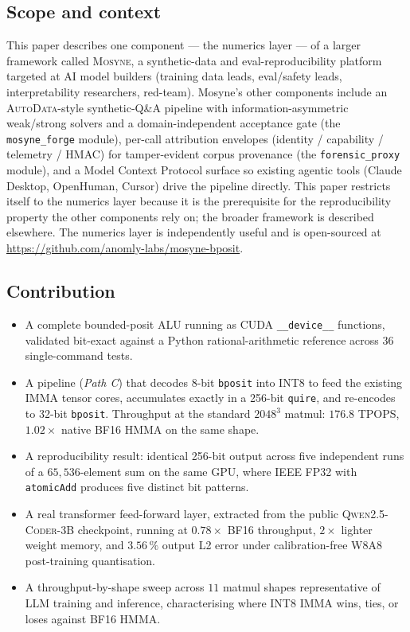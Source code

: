 \documentclass[11pt,a4paper]{article}
\newcommand{\bposit}{\texttt{bposit}}
\newcommand{\quire}{\texttt{quire}}
\newcommand{\TPOPS}{\textsf{TPOPS}}
\begin{document}
\subsection*{Scope and context}

This paper describes one component --- the numerics layer --- of a
larger framework called \textsc{Mosyne}, a synthetic-data and
eval-reproducibility platform targeted at AI model builders (training
data leads, eval/safety leads, interpretability researchers,
red-team). Mosyne's other components include an \textsc{AutoData}-style
synthetic-Q\&A pipeline with information-asymmetric weak/strong
solvers and a domain-independent acceptance gate (the
\texttt{mosyne\_forge} module), per-call attribution envelopes
(identity / capability / telemetry / HMAC) for tamper-evident corpus
provenance (the \texttt{forensic\_proxy} module), and a Model Context
Protocol surface so existing agentic tools (Claude Desktop, OpenHuman,
Cursor) drive the pipeline directly. This paper restricts itself to
the numerics layer because it is the prerequisite for the
reproducibility property the other components rely on; the broader
framework is described elsewhere. The numerics layer is independently
useful and is open-sourced at
\url{https://github.com/anomly-labs/mosyne-bposit}.

\subsection{Contribution}

\begin{itemize}
    \item A complete bounded-posit ALU running as CUDA
          \texttt{\_\_device\_\_} functions, validated bit-exact against
          a Python rational-arithmetic reference across 36
          single-command tests.
    \item A pipeline (\emph{Path C}) that decodes 8-bit \bposit{} into
          INT8 to feed the existing IMMA tensor cores, accumulates
          exactly in a 256-bit \quire{}, and re-encodes to 32-bit
          \bposit{}. Throughput at the standard $2048^3$ matmul:
          $176.8$ \TPOPS{}, $1.02\times$ native BF16 HMMA on the same
          shape.
    \item A reproducibility result: identical 256-bit output across
          five independent runs of a $65{,}536$-element sum on the
          same GPU, where IEEE FP32 with \texttt{atomicAdd} produces
          five distinct bit patterns.
    \item A real transformer feed-forward layer, extracted from the
          public \textsc{Qwen2.5-Coder-3B} checkpoint, running at
          $0.78\times$ BF16 throughput, $2\times$ lighter weight
          memory, and $3.56\,\%$ output L2 error under calibration-free
          W8A8 post-training quantisation.
    \item A throughput-by-shape sweep across $11$ matmul shapes
          representative of LLM training and inference, characterising
          where INT8 IMMA wins, ties, or loses against BF16 HMMA.
\end{itemize}
\end{document}

